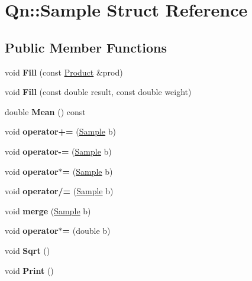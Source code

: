 \hypertarget{structQn_1_1Sample}{}\section{Qn\+:\+:Sample Struct Reference}
\label{structQn_1_1Sample}
\subsection*{Public Member Functions}
\begin{DoxyCompactItemize}
\item 
\mbox{\label{structQn_1_1Sample_a79fe384007d4b215e1184216e4356dfa}} 
void {\bfseries Fill} (const \mbox{\hyperlink{structQn_1_1Product}{Product}} \&prod)
\item 
\mbox{\label{structQn_1_1Sample_a7998ba5a8f8cd775283c9f33c3d72bfa}} 
void {\bfseries Fill} (const double result, const double weight)
\item 
\mbox{\label{structQn_1_1Sample_ab386b4e8093e9d20cd864b20670ea0dc}} 
double {\bfseries Mean} () const
\item 
\mbox{\label{structQn_1_1Sample_a07f1b2a1a80a09998c610d1db3c029a8}} 
void {\bfseries operator+=} (\mbox{\hyperlink{structQn_1_1Sample}{Sample}} b)
\item 
\mbox{\label{structQn_1_1Sample_a2e2af5857e18218d7972360ae4d42a60}} 
void {\bfseries operator-\/=} (\mbox{\hyperlink{structQn_1_1Sample}{Sample}} b)
\item 
\mbox{\label{structQn_1_1Sample_a1bb72ce4b0d0e776389b8367bb60941b}} 
void {\bfseries operator$\ast$=} (\mbox{\hyperlink{structQn_1_1Sample}{Sample}} b)
\item 
\mbox{\label{structQn_1_1Sample_a2648f2a1d5655876cfa37f7ee2f72552}} 
void {\bfseries operator/=} (\mbox{\hyperlink{structQn_1_1Sample}{Sample}} b)
\item 
\mbox{\label{structQn_1_1Sample_a2b80187b6335525bbdcfea7aa7416343}} 
void {\bfseries merge} (\mbox{\hyperlink{structQn_1_1Sample}{Sample}} b)
\item 
\mbox{\label{structQn_1_1Sample_a61b7720a4218a857a90dace4c0945503}} 
void {\bfseries operator$\ast$=} (double b)
\item 
\mbox{\label{structQn_1_1Sample_af676564453e535ee04f75fff97fa26b3}} 
void {\bfseries Sqrt} ()
\item 
\mbox{\label{structQn_1_1Sample_a1e6c494962e4d0b970716594679a3acb}} 
void {\bfseries Print} ()
\end{DoxyCompactItemize}
